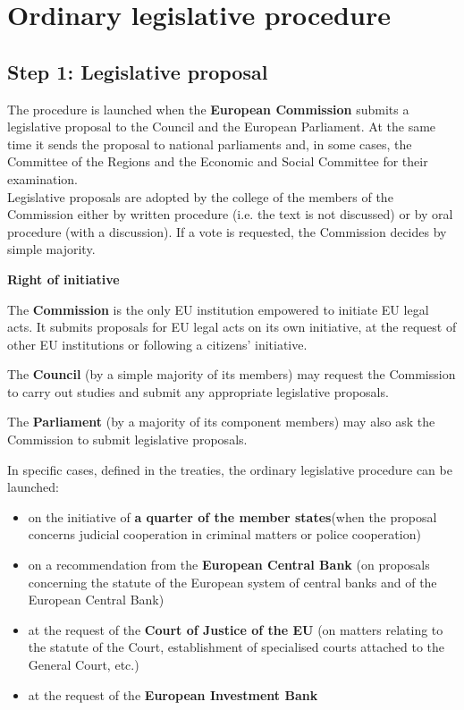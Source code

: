 \section{Ordinary legislative procedure}
\label{sec:OLP}

\subsection{Step 1: Legislative proposal}

The procedure is launched when the \textbf{European Commission} submits a legislative proposal to the Council and the European Parliament. At the same time it sends the proposal to national parliaments and, in some cases, the Committee of the Regions and the Economic and Social Committee for their examination.
\\
Legislative proposals are adopted by the college of the members of the Commission either by written procedure (i.e. the text is not discussed) or by oral procedure (with a discussion). If a vote is requested, the Commission decides by simple majority.\nextline

\textbf{Right of initiative}

The \textbf{Commission} is the only EU institution empowered to initiate EU legal acts. It submits proposals for EU legal acts on its own initiative, at the request of other EU institutions or following a citizens' initiative.

The \textbf{Council} (by a simple majority of its members) may request the Commission to carry out studies and submit any appropriate legislative proposals.

The \textbf{Parliament} (by a majority of its component members) may also ask the Commission to submit legislative proposals.

In specific cases, defined in the treaties, the ordinary legislative procedure can be launched:
\begin{itemize}
\item on the initiative of \textbf{a quarter of the member states}(when the proposal concerns judicial cooperation in criminal matters or police cooperation)
\item on a recommendation from the \textbf{European Central Bank} (on proposals concerning the statute of the European system of central banks and of the European Central Bank)
\item at the request of the \textbf{Court of Justice of the EU} (on matters relating to the statute of the Court, establishment of specialised courts attached to the General Court, etc.)
\item at the request of the \textbf{European Investment Bank}
\end{itemize}

